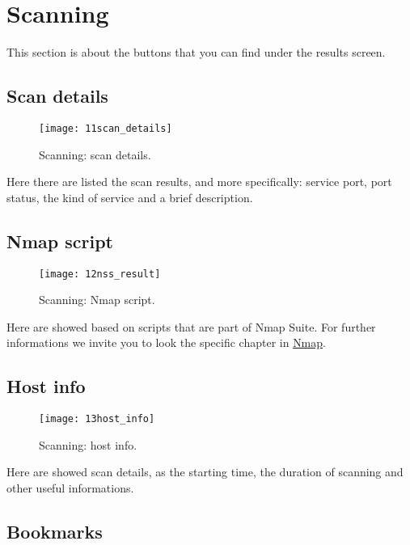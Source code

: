 \section{Scanning}
\label{sec:ContentsScan}

This section is about the buttons that you can find under the results screen.

\subsection{Scan details}
\label{sec:ContentsScanScanDetails}

\begin{figure}[h]
  \centering
  \texttt{[image: 11scan\_details]}
  \caption{Scanning: scan details.}
  \label{fig:ContentsScanScanDetails}
\end{figure}
Here there are listed the scan results, and more specifically: service port,
port status, the kind of service and a brief description.

\subsection{Nmap script}
\label{sec:ContentsScanNmapScript}

\begin{figure}[h]
  \centering
  \texttt{[image: 12nss\_result]}
  \caption{Scanning: Nmap script.}
  \label{fig:ContentsScanNmapScript}
\end{figure}
Here are showed based on scripts that are part of Nmap Suite. For further 
informations we invite you to look the specific chapter in 
\href{http://nmap.org/book/nse.html}{Nmap}.

\subsection{Host info}
\label{sec:ContentsScanHostInfo}

\begin{figure}[h]
  \centering
  \texttt{[image: 13host\_info]}
  \caption{Scanning: host info.}
  \label{fig:ContentsScanHostInfo}
\end{figure}
Here are showed scan details, as the starting time, the duration of scanning 
and other useful informations.

\subsection{Bookmarks}
\label{sec:ContentsScanBookmarks}

